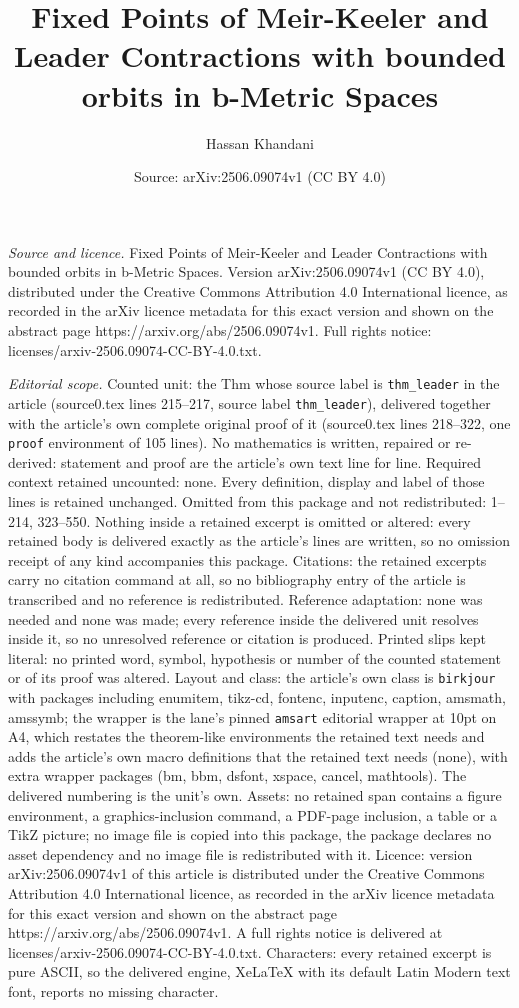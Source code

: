 \documentclass[10pt,a4paper]{amsart}
\title[Fixed Points of Meir-Keeler and Leader Contractions with bou]{Fixed Points of Meir-Keeler and Leader Contractions with bounded orbits in b-Metric Spaces}
\author{Hassan Khandani}
\date{Source: arXiv:2506.09074v1 (CC BY 4.0)}
\begin{document}
\maketitle

\noindent\emph{Source and licence.} Fixed Points of Meir-Keeler and Leader Contractions with bounded orbits in b-Metric Spaces. Version arXiv:2506.09074v1 (CC BY 4.0), distributed under the Creative Commons Attribution 4.0 International licence, as recorded in the arXiv licence metadata for this exact version and shown on the abstract page https://arxiv.org/abs/2506.09074v1. Full rights notice: licenses/arxiv-2506.09074-CC-BY-4.0.txt.\par\smallskip

\noindent\textit{Editorial scope.} Counted unit: the Thm whose source label is \texttt{thm\_leader} in the article (source0.tex lines 215--217, source label \texttt{thm\_leader}), delivered together with the article's own complete original proof of it (source0.tex lines 218--322, one \texttt{proof} environment of 105 lines). No mathematics is written, repaired or re-derived: statement and proof are the article's own text line for line. Required context retained uncounted: none. Every definition, display and label of those lines is retained unchanged. Omitted from this package and not redistributed: 1--214, 323--550. Nothing inside a retained excerpt is omitted or altered: every retained body is delivered exactly as the article's lines are written, so no omission receipt of any kind accompanies this package. Citations: the retained excerpts carry no citation command at all, so no bibliography entry of the article is transcribed and no reference is redistributed. Reference adaptation: none was needed and none was made; every reference inside the delivered unit resolves inside it, so no unresolved reference or citation is produced. Printed slips kept literal: no printed word, symbol, hypothesis or number of the counted statement or of its proof was altered. Layout and class: the article's own class is \texttt{birkjour} with packages including enumitem, tikz-cd, fontenc, inputenc, caption, amsmath, amssymb; the wrapper is the lane's pinned \texttt{amsart} editorial wrapper at 10pt on A4, which restates the theorem-like environments the retained text needs and adds the article's own macro definitions that the retained text needs (none), with extra wrapper packages (bm, bbm, dsfont, xspace, cancel, mathtools). The delivered numbering is the unit's own. Assets: no retained span contains a figure environment, a graphics-inclusion command, a PDF-page inclusion, a table or a TikZ picture; no image file is copied into this package, the package declares no asset dependency and no image file is redistributed with it. Licence: version arXiv:2506.09074v1 of this article is distributed under the Creative Commons Attribution 4.0 International licence, as recorded in the arXiv licence metadata for this exact version and shown on the abstract page https://arxiv.org/abs/2506.09074v1. A full rights notice is delivered at licenses/arxiv-2506.09074-CC-BY-4.0.txt. Characters: every retained excerpt is pure ASCII, so the delivered engine, XeLaTeX with its default Latin Modern text font, reports no missing character.
\end{document}

